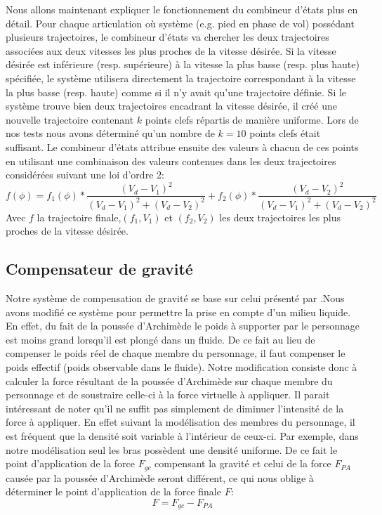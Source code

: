 \documentclass[runningheads,a4paper]{llncs}
\begin{document}
Nous allons maintenant expliquer le fonctionnement du combineur d'états plus en détail. Pour chaque articulation où système (e.g. pied en phase de vol) possédant plusieurs trajectoires, le combineur d'états va chercher les deux trajectoires associées aux deux vitesses les plus proches de la vitesse désirée. Si la vitesse désirée est inférieure (resp. supérieure) à la vitesse la plus basse (resp. plus haute) spécifiée, le système utilisera directement la trajectoire correspondant à la vitesse la plus basse (resp. haute) comme si il n'y avait qu'une trajectoire définie. Si le système trouve bien deux trajectoires encadrant la vitesse désirée, il créé une nouvelle trajectoire contenant $k$ points clefs répartis de manière uniforme. Lors de nos tests nous avons déterminé qu'un nombre de $k=10$ points clefs était suffisant. Le combineur d'états attribue ensuite des valeurs à chacun de ces points en utilisant une combinaison des valeurs contenues dans les deux trajectoires considérées suivant une loi d'ordre 2:
$$
f(\phi)=f_1(\phi)*\frac{(V_d-V_1)^2}{(V_d-V_1)^2+(V_d-V_2)^2}+f_2(\phi)*\frac{(V_d-V_2)^2}{(V_d-V_1)^2+(V_d-V_2)^2}
$$
Avec $f$ la trajectoire finale,$(f_1,V_1)$ et $(f_2,V_2)$ les deux trajectoires les plus proches de la vitesse désirée.
% 
\subsection{Compensateur de gravité}
\label{sec:grav_comp}
Notre système de compensation de gravité se base sur celui présenté par \cite{coros2010generalized}.Nous avons modifié ce système pour permettre la prise en compte d'un milieu liquide. En effet, du fait de la poussée d'Archimède le poids à supporter par le personnage est moins grand lorsqu'il est plongé dans un fluide. De ce fait au lieu de compenser le poids réel de chaque membre du personnage, il faut compenser le poids effectif (poids observable dans le fluide). Notre modification consiste donc à calculer la force résultant de la poussée d'Archimède sur chaque membre du personnage et de soustraire celle-ci à la force virtuelle à appliquer. Il parait intéressant de noter qu'il ne suffit pas simplement de diminuer l'intensité de la force à appliquer. En effet suivant la modélisation des membres du personnage, il est fréquent que la densité soit variable à l'intérieur de ceux-ci. Par exemple, dans notre modélisation seul les bras possèdent une densité uniforme. De ce fait le point d'application de la force  $F_{gc}$ compensant la gravité et celui de la force $F_{PA}$ causée par la poussée d'Archimède seront différent, ce qui nous oblige à déterminer le point d'application de la force finale $F$:
$$
F=F_{gc}- F_{PA}
$$
\end{document}
